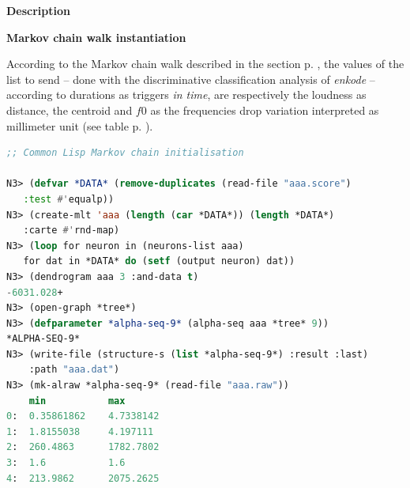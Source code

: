 



\noindent \textbf{{\large Description}}
\hrulefill

\bigskip

  \textbf{
  Markov chain walk instantiation }
  
  \smallskip
 
 According to the Markov chain walk described in the section \textsl{} p. \pageref{osc}, 
 the values of the list to send -- done with the discriminative classification analysis of \textsl{enkode} -- according to durations as triggers \textit{in time}, are respectively the loudness as distance, the centroid and $f0$ as the frequencies drop variation interpreted as millimeter unit (see table p. \pageref{tab:apc}).
  
 \bigskip
\begin{lstlisting}[basicstyle=\footnotesize\ttfamily,language=Lisp]
;; Common Lisp Markov chain initialisation

N3> (defvar *DATA* (remove-duplicates (read-file "aaa.score")
   :test #'equalp))
N3> (create-mlt 'aaa (length (car *DATA*)) (length *DATA*)
   :carte #'rnd-map)
N3> (loop for neuron in (neurons-list aaa)
   for dat in *DATA* do (setf (output neuron) dat))
N3> (dendrogram aaa 3 :and-data t)
-6031.028+
N3> (open-graph *tree*)
N3> (defparameter *alpha-seq-9* (alpha-seq aaa *tree* 9))
*ALPHA-SEQ-9*
N3> (write-file (structure-s (list *alpha-seq-9*) :result :last) 
    :path "aaa.dat")
N3> (mk-alraw *alpha-seq-9* (read-file "aaa.raw"))
    min           max
0:  0.35861862    4.7338142
1:  1.8155038     4.197111
2:  260.4863      1782.7802
3:  1.6           1.6
4:  213.9862      2075.2625
\end{lstlisting}

